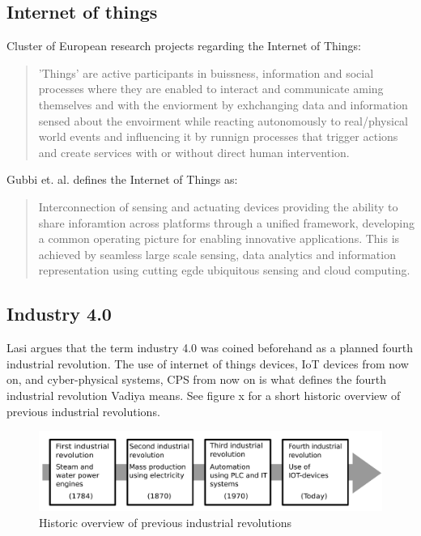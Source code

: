 \subsection{Internet of things}
Cluster of European research projects regarding the Internet of Things:
\begin{quote}
    'Things' are active participants in buissness, information and social processes where they are enabled to interact and communicate aming themselves and with the enviorment by exhchanging data and information sensed about the envoirment while reacting autonomously to real/physical world events and influencing it by runnign processes that trigger actions and create services with or without direct human intervention.\cite{Gubbi2013}
\end{quote} 

Gubbi et. al. defines the Internet of Things as:
\begin{quote}
    Interconnection of sensing and actuating devices providing the ability to share inforamtion across platforms through a unified framework, developing a common operating picture for enabling innovative applications. 
    This is achieved by seamless large scale sensing, data analytics and information representation using cutting egde ubiquitous sensing and cloud computing.\cite{Gubbi2013}
\end{quote}

\subsection{Industry 4.0}
Lasi argues that the term industry 4.0 was coined beforehand as a planned fourth industrial revolution.\cite{Lasi2014}
The use of internet of things devices, IoT devices from now on, and cyber-physical systems, CPS from now on is what defines the fourth industrial revolution Vadiya means.\cite{Vaidya2018}
See figure x for a short historic overview of previous industrial revolutions.   
\begin{figure}
    \centering
    \includegraphics[width=\textwidth]{Pictures/Industrial_revolution.pdf} 
    \caption{Historic overview of previous industrial revolutions}
    \label{Indutrial revolutions}
\end{figure}

